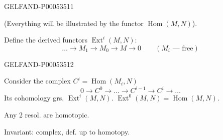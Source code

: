 \begin{GelfandAdjacentEvidence}{GELFAND-P000535}{11}



(Everything will be illustrated by the functor $\operatorname{Hom}(M,N)$).

Define the derived functors $\operatorname{Ext}^i(M,N)$:
\[
\ldots\to M_1\to M_0\to M\to0\qquad (M_i\text{ — free})
\]
\end{GelfandAdjacentEvidence}
\begin{GelfandAdjacentEvidence}{GELFAND-P000535}{12}


Consider the complex \(C^i=\operatorname{Hom}(M_i,N)\)
\[
0\to C^0\to\ldots\to C^{i-1}\to C^i\to\ldots
\]
Its cohomology grs. $\operatorname{Ext}^i(M,N)$.
\quad $\operatorname{Ext}^0(M,N)=\operatorname{Hom}(M,N)$.

Any 2 resol. are homotopic.

Invariant: complex, def. up to homotopy.
\end{GelfandAdjacentEvidence}
